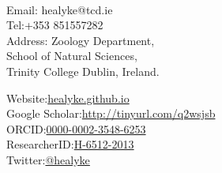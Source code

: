 \documentclass[10pt,a4paper]{article}
\begin{document}
\par{\smallskip\par}

\large{}\\

\par{\normalsize{}\bigskip\par}


\begin{minipage}[t]{0.5\textwidth}
\raggedright

Email:  healyke@tcd.ie\\
Tel:\hspace{0mm}+353 851557282\\
Address: Zoology Department,\\
\hspace{0mm}School of Natural Sciences,\\
\hspace{0mm}Trinity College Dublin, Ireland.\\ 


\end{minipage}
\begin{minipage}[t]{0.45\textwidth}

Website:\href{http://healyke.github.io}{healyke.github.io}\\
Google Scholar:\href{http://scholar.google.com/citations?user=5Kb9u8EAAAAJ}{http://tinyurl.com/q2wsjsb}\\
ORCID:\href{http://orcid.org/0000-0002-3548-6253}{0000-0002-3548-6253}\\
ResearcherID:\href{http://www.researcherid.com/rid/H-6512-2013}{H-6512-2013}\\
Twitter:\href{https://twitter.com/healyke}{@healyke}\\
\end{minipage}

\bigskip

\end{document}
